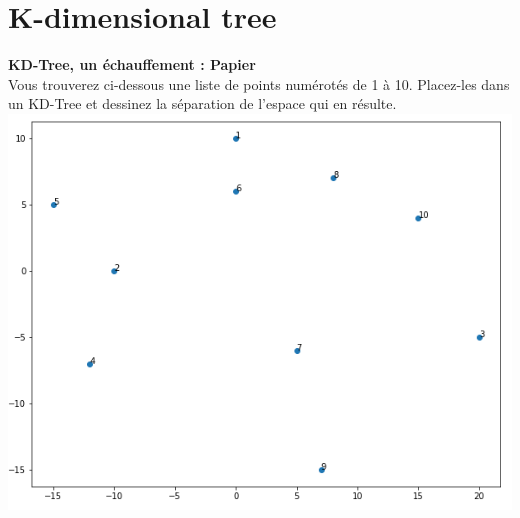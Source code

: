 \section{K-dimensional tree}

\begin{Exercice}[5 minutes]\textbf{KD-Tree, un échauffement : Papier}\\
Vous trouverez ci-dessous une liste de points numérotés de 1 à 10. Placez-les dans un KD-Tree et dessinez la séparation de l'espace qui en résulte.\\

\includegraphics[]{Ressources/KD_points.PNG}


\end{Exercice}
